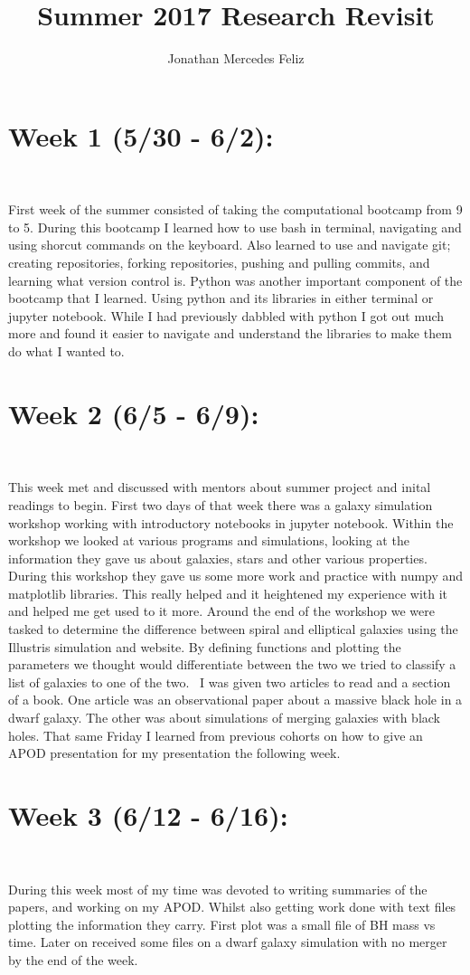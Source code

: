 \documentclass{article}
\title{Summer 2017 Research Revisit}
\author{Jonathan Mercedes Feliz}
\begin{document}
\maketitle{}
\section{Week 1 (5/30 - 6/2):}
\
\par First week of the summer consisted of taking the computational bootcamp from 9 to 5. During this bootcamp I learned how to use bash in terminal, navigating and using shorcut commands on the keyboard. Also learned to use and navigate git; creating repositories, forking repositories, pushing and pulling commits, and learning what version control is. Python was another important component of the bootcamp that I learned. Using python and its libraries in either terminal or jupyter notebook. While I had previously dabbled with python I got out much more and found it easier to navigate and understand the libraries to make them do what I wanted to.
\section{Week 2 (6/5 - 6/9):}
\
\par  This week met and discussed with mentors about summer project and inital readings to begin. First two days of that week there was a galaxy simulation workshop working with introductory notebooks in jupyter notebook. Within the workshop we looked at various programs and simulations, looking at the information they gave us about galaxies, stars and other various properties. During this workshop they gave us some more work and practice with numpy and matplotlib libraries. This really helped and it heightened my experience with it and helped me get used to it more. Around the end of the workshop we were tasked to determine the difference between spiral and elliptical galaxies using the Illustris simulation and website. By defining functions and plotting the parameters we thought would differentiate between the two we tried to classify a list of galaxies to one of the two. 
\
I was given two articles to read and a section of a book. One article was an observational paper about a massive black hole in a dwarf galaxy. The other was about simulations of merging galaxies with black holes. That same Friday I learned from previous cohorts on how to give an APOD presentation for my presentation  the following week.
\section{Week 3 (6/12 - 6/16):}
\
\par  During this week most of my time was devoted to writing summaries of the papers, and working on my APOD. Whilst also getting work done with text files plotting the information they carry. First plot was a small file of BH mass vs time. Later on received some files on a dwarf galaxy simulation with no merger by the end of the week.
\end{document}
